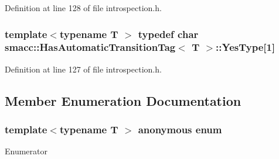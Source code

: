 Definition at line 128 of file introspection.\+h.

\subsubsection[{\texorpdfstring{Yes\+Type}{YesType}}]{\setlength{\rightskip}{0pt plus 5cm}template$<$typename T $>$ typedef char {\bf smacc\+::\+Has\+Automatic\+Transition\+Tag}$<$ T $>$\+::Yes\+Type\mbox{[}1\mbox{]}\hspace{0.3cm}{\ttfamily [private]}}\hypertarget{classsmacc_1_1HasAutomaticTransitionTag_ad3b0dca13c15ca18d97bbfa0f613614c}{}\label{classsmacc_1_1HasAutomaticTransitionTag_ad3b0dca13c15ca18d97bbfa0f613614c}


Definition at line 127 of file introspection.\+h.



\subsection{Member Enumeration Documentation}
\subsubsection[{\texorpdfstring{anonymous enum}{anonymous enum}}]{\setlength{\rightskip}{0pt plus 5cm}template$<$typename T $>$ anonymous enum}\hypertarget{classsmacc_1_1HasAutomaticTransitionTag_a129d2cfdc3c2071feb6eed2f328e77de}{}\label{classsmacc_1_1HasAutomaticTransitionTag_a129d2cfdc3c2071feb6eed2f328e77de}
\begin{Desc}
\item[Enumerator]\par
\begin{description}
\item[{\em 
value\hypertarget{classsmacc_1_1HasAutomaticTransitionTag_a129d2cfdc3c2071feb6eed2f328e77deac3cf7791b7f6bf4d5f4c7a93de7624a8}{}\label{classsmacc_1_1HasAutomaticTransitionTag_a129d2cfdc3c2071feb6eed2f328e77deac3cf7791b7f6bf4d5f4c7a93de7624a8}
}]\end{description}
\end{Desc}


